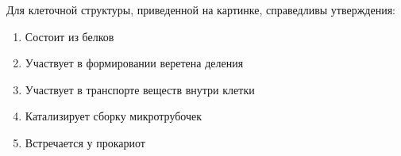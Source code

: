
Для
клеточной структуры, приведенной на картинке, справедливы утверждения:


\begin{enumerate}
    \item Состоит из белков
    \item Участвует в формировании веретена деления
    \item Участвует в транспорте веществ внутри клетки
    \item Катализирует сборку микротрубочек
    \item Встречается у прокариот
\end{enumerate}


\explanationSection

